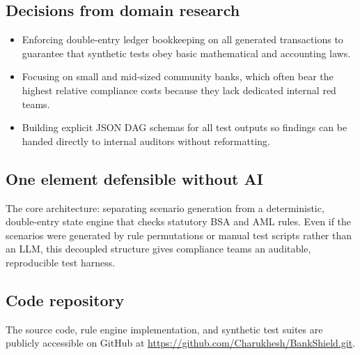 \documentclass[10pt,twocolumn,a4paper]{article}
\begin{document}
\subsection*{Decisions from domain research}
\begin{itemize}
    \item Enforcing double-entry ledger bookkeeping on all generated transactions to guarantee that synthetic tests obey basic mathematical and accounting laws.
    \item Focusing on small and mid-sized community banks, which often bear the highest relative compliance costs because they lack dedicated internal red teams.
    \item Building explicit JSON DAG schemas for all test outputs so findings can be handed directly to internal auditors without reformatting.
\end{itemize}

\subsection*{One element defensible without AI}
The core architecture: separating scenario generation from a deterministic, double-entry state engine that checks statutory BSA and AML rules. Even if the scenarios were generated by rule permutations or manual test scripts rather than an LLM, this decoupled structure gives compliance teams an auditable, reproducible test harness.

\subsection*{Code repository}
The source code, rule engine implementation, and synthetic test suites are publicly accessible on GitHub at \url{https://github.com/Charukhesh/BankShield.git}.
\end{document}
